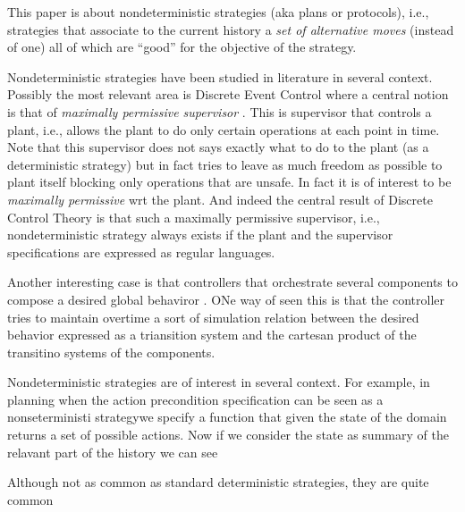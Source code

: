This paper is about nondeterministic strategies (aka plans or protocols), i.e., strategies that associate to the current history a \emph{set of alternative moves} (instead of one) all of which are ``good'' for the objective of the strategy.

Nondeterministic strategies have been studied in literature in several
context.
Possibly the most relevant area is Discrete Event Control
where a central notion is that of \emph{maximally permissive
  supervisor} \cite{}. This is supervisor that controls a plant, i.e.,
allows the plant to do only certain operations at each point in
time. Note that this supervisor does not says exactly what to do to
the plant (as a deterministic strategy) but in fact tries to leave as
much freedom as possible to plant itself blocking only operations that
are unsafe. In fact it is of interest to be \emph{maximally
  permissive} wrt the plant. And indeed the central result of Discrete
Control Theory is that such a maximally permissive supervisor, i.e.,
nondeterministic strategy always exists if the plant and the
supervisor specifications are expressed as regular languages.


Another interesting case is that controllers that orchestrate several components to compose a desired global behaviror \cite{Sardina,Logan}. ONe way of seen this is that the controller tries to maintain overtime a sort of simulation relation between the desired behavior expressed as a triansition system and the cartesan product of the transitino systems of the components.


Nondeterministic strategies are of interest in several context. For example, in planning when the action precondition specification can be seen as a nonseterministi strategywe specify a function that given the state of the domain returns a set of possible actions. Now if we consider the state as summary of the relavant part of the history we can see  


Although not as common as standard deterministic strategies, they are quite common


